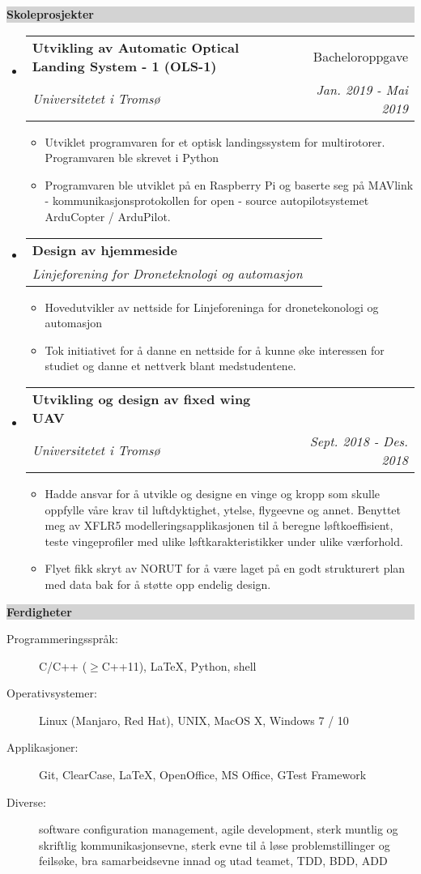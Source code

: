 \documentclass[letterpaper,11pt]{article}
\makeatletter
\newcommand{\resitem}[1]{\item #1 \vspace{-2pt}}
\newcommand{\resheading}[1]{{\large \noindent\colorbox{lightgray}{\begin{minipage}{\linewidth-2\fboxsep}{\textbf{#1}}\end{minipage}}}}%
\newcommand{\ressubheading}[4]{
\begin{tabular*}{6.5in}{l@{\extracolsep{\fill}}r}
		\textbf{#1} & #2 \\
		\textit{#3} & \textit{#4} \\
\end{tabular*}\vspace{-5pt}}
\makeatother
\begin{document}
\resheading{Skoleprosjekter}
\begin{itemize}
\item
   \ressubheading{Utvikling av Automatic Optical Landing System - 1 (OLS-1)}{Bacheloroppgave}{Universitetet i Tromsø}{Jan. 2019 - Mai 2019}
	\begin{itemize}
           \resitem{Utviklet programvaren for et optisk landingssystem for multirotorer. Programvaren ble skrevet i Python}
           \resitem{Programvaren ble utviklet på en Raspberry Pi og baserte seg på MAVlink - kommunikasjonsprotokollen for open - source autopilotsystemet ArduCopter / ArduPilot.}
	\end{itemize}

\item
	\ressubheading{Design av hjemmeside}{}{Linjeforening for Droneteknologi og automasjon }{}
	\begin{itemize}
           \resitem{Hovedutvikler av nettside for Linjeforeninga for dronetekonologi og automasjon}
           \resitem{Tok initiativet for å danne en nettside for å kunne øke interessen for studiet og danne et nettverk blant medstudentene.}
	\end{itemize}

\item
   \ressubheading{Utvikling og design av fixed wing UAV}{}{Universitetet i Tromsø}{Sept. 2018 - Des. 2018}
	\begin{itemize}
           \resitem{Hadde ansvar for å utvikle og designe en vinge og kropp som skulle oppfylle våre krav til luftdyktighet, ytelse, flygeevne og annet. Benyttet meg av XFLR5 modelleringsapplikasjonen til å beregne løftkoeffisient, teste vingeprofiler med ulike løftkarakteristikker under ulike værforhold.}
           \resitem{Flyet fikk skryt av NORUT for å være laget på en godt strukturert plan med data bak for å støtte opp endelig design.}
	\end{itemize}

\end{itemize}

\resheading{Ferdigheter}

\begin{description}
\item[Programmeringsspråk:]
C/C++ ($\geq$C++11), \LaTeX, Python, shell
\item[Operativsystemer:]
Linux (Manjaro, Red Hat), UNIX, MacOS X, Windows 7 / 10
\item[Applikasjoner:]
Git, ClearCase, \LaTeX, OpenOffice, MS Office, GTest Framework
\item[Diverse:]
software configuration management, agile development, sterk muntlig og skriftlig kommunikasjonsevne, sterk evne til å løse problemstillinger og feilsøke, bra samarbeidsevne innad og utad teamet, TDD, BDD, ADD
\end{description}
\end{document}
